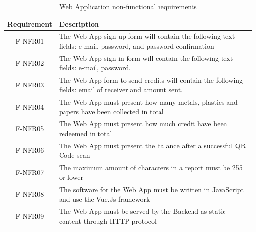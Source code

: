 \documentclass[a4paper,11pt]{article}
\begin{document}
\begin{table}[H]
  \caption{\small{Web Application non-functional requirements}}
  \begin{center}
    \begin{tabular}{|c|p{95mm}|}
      \hline
      Requirement & Description                                                                                                  \\ \hline
      F-NFR01     & The Web App sign up form will contain the following text fields: e-mail, password, and password confirmation \\ \hline
      F-NFR02     & The Web App sign in form will contain the following text fields: e-mail, password.                           \\ \hline
      F-NFR03     & The Web App form to send credits will contain the following fields: email of receiver and amount sent.       \\ \hline
      F-NFR04     & The Web App must present how many metals, plastics and papers have been collected in total                   \\ \hline
      F-NFR05     & The Web App must present how much credit have been redeemed in total                                         \\ \hline
      F-NFR06     & The Web App must present the balance after a successful QR Code scan                                         \\ \hline
      F-NFR07     & The maximum amount of characters in a report must be 255 or lower                                            \\ \hline
      F-NFR08     & The software for the Web App must be written in JavaScript and use the Vue.Js framework                      \\ \hline
      F-NFR09     & The Web App must be served by the Backend as static content through HTTP protocol                            \\ \hline
    \end{tabular}
  \end{center}
  \label{tab:app1}
\end{table}
\end{document}
